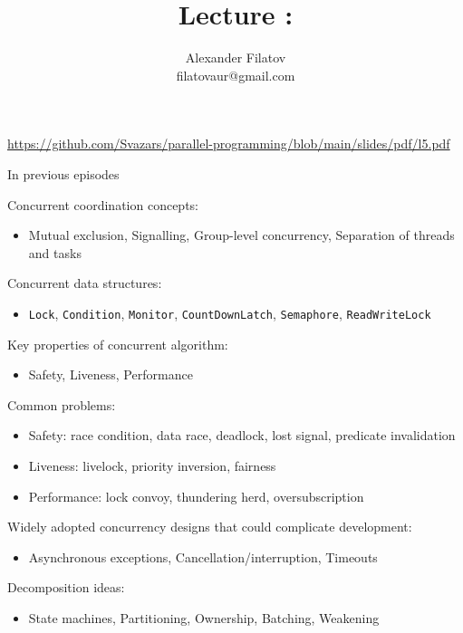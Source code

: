


\title[]{Lecture \extraBasicsNum: \extraBasicsTopic}
\subtitle[]{\extraBasicsKey}
\author[]{Alexander Filatov\\ filatovaur@gmail.com}

\date{}


\newcommand{\taskJCStress}{5.1}



\begin{frame}
  \titlepage
  \url{https://github.com/Svazars/parallel-programming/blob/main/slides/pdf/l5.pdf}
\end{frame}


\begin{frame}{In previous episodes}

Concurrent coordination concepts:
\begin{itemize}
    \item Mutual exclusion, Signalling, Group-level concurrency, Separation of threads and tasks
\end{itemize}

Concurrent data structures:
\begin{itemize}
    \item \texttt{Lock}, \texttt{Condition}, \texttt{Monitor}, \texttt{CountDownLatch}, \texttt{Semaphore}, \texttt{ReadWriteLock}
\end{itemize}

Key properties of concurrent algorithm:
\begin{itemize}
    \item Safety, Liveness, Performance
\end{itemize}

Common problems:
\begin{itemize}
    \item Safety: race condition, data race, deadlock, lost signal, predicate invalidation
    \item Liveness: livelock, priority inversion, fairness  
    \item Performance: lock convoy, thundering herd, oversubscription
\end{itemize}

Widely adopted concurrency designs that could complicate development:
\begin{itemize}
  \item Asynchronous exceptions, Cancellation/interruption, Timeouts
\end{itemize}

Decomposition ideas:
\begin{itemize}
  \item State machines, Partitioning, Ownership, Batching, Weakening
\end{itemize}
\end{frame}

